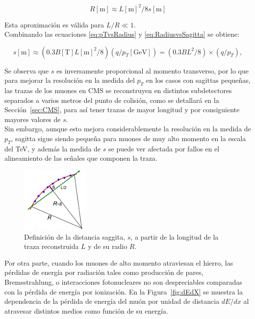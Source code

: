 \begin{equation}
  R[\text{m}]\approx L[\text{m}]^{2}/8s[\text{m}]
\label{eq:RadiusvsSagitta}
\end{equation}

Esta aproximaci\'on es v\'alida para $L/R \ll 1$. \\

Combinando las ecuaciones \eqref{eq:pTvsRadius} y \eqref{eq:RadiusvsSagitta} se obtiene:

\begin{equation}
  s[\text{m}]\approx (0.3 B [\text{T}] L[\text{m}]^{2}/8) (q/p_{T}[\text{GeV}]) =  (0.3 BL^{2}/8) \times (q/p_{T}),
\label{eq:SagittavsPt}
\end{equation}

Se observa que $s$ es inversamente proporcional al momento transverso, por lo que para mejorar la resoluci\'on en la medida del $p_{T}$ en los casos con sagittas peque\~nas, las trazas de los muones en CMS se reconstruyen en distintos subdetectores separados a varios metros del punto de colisi\'on, como se detallar\'a en la Secci\'on~\ref{sec:CMS}, para as\'i tener trazas de mayor longitud y por consiguiente mayores valores de $s$. \\
Sin embargo, aunque esto mejora considerablemente la resoluci\'on en la medida de $p_{T}$, sagitta sigue siendo peque\~na para muones de muy alto momento en la escala del TeV, y adem\'as la medida de $s$ se puede ver afectada por fallos en el alineamiento de las se\~nales que componen la traza. \\

\begin{figure}[h]
\centering
\includegraphics[width=0.30\textwidth]{figures/curvaturesketch.png}
\caption{Definici\'on de la distancia saggita, $s$, a partir de la longitud de la traza reconstruida $L$ y de su radio $R$.}
\label{fig:SagittaDef}
\end{figure}

Por otra parte, cuando los muones de alto momento atraviesan el hierro, las p\'erdidas de energ\'ia por radiaci\'on tales como producci\'on de pares, Bremsstrahlung, o interacciones fotonucleares no son despreciables comparadas con la p\'erdida de energ\'ia por ionizaci\'on. En la Figura~\ref{fig:dEdX} se muestra la dependencia de la p\'erdida de energ\'ia del mu\'on por unidad de distancia $dE/dx$ al atravesar distintos medios como funci\'on de su energ\'ia.

